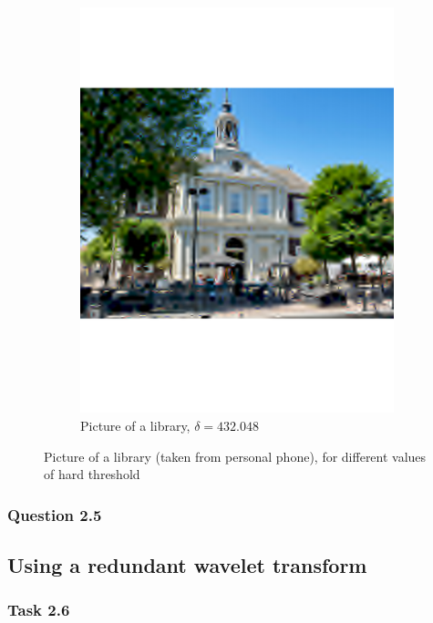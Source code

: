 \documentclass[a4paper]{article}
\begin{document}
\begin{figure}[H]
\begin{subfigure}{0.49\textwidth}
	\includegraphics[trim={4cm 8cm 4cm 8cm},clip,width=1\textwidth]{Images/BibBad.pdf}
	\caption{Picture of a library, $\delta = 432.048$}
	\label{sub:BibBad}
\end{subfigure}
	\caption{Picture of a library (taken from personal phone), for different values of hard threshold}
	\label{fig:Bib}
\end{figure}

    \subsubsection{Question 2.5}

    \subsection{Using a redundant wavelet transform}

    \subsubsection{Task 2.6}
\end{document}

